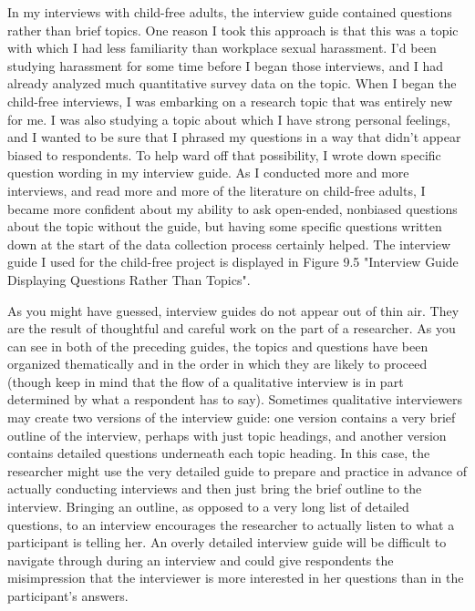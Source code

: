 In my interviews with child-free adults, the interview guide contained questions rather than brief topics. One reason I took this approach is that this was a topic with which I had less familiarity than workplace sexual harassment. I’d been studying harassment for some time before I began those interviews, and I had already analyzed much quantitative survey data on the topic. When I began the child-free interviews, I was embarking on a research topic that was entirely new for me. I was also studying a topic about which I have strong personal feelings, and I wanted to be sure that I phrased my questions in a way that didn’t appear biased to respondents. To help ward off that possibility, I wrote down specific question wording in my interview guide. As I conducted more and more interviews, and read more and more of the literature on child-free adults, I became more confident about my ability to ask open-ended, nonbiased questions about the topic without the guide, but having some specific questions written down at the start of the data collection process certainly helped. The interview guide I used for the child-free project is displayed in Figure 9.5 "Interview Guide Displaying Questions Rather Than Topics".

As you might have guessed, interview guides do not appear out of thin air. They are the result of thoughtful and careful work on the part of a researcher. As you can see in both of the preceding guides, the topics and questions have been organized thematically and in the order in which they are likely to proceed (though keep in mind that the flow of a qualitative interview is in part determined by what a respondent has to say). Sometimes qualitative interviewers may create two versions of the interview guide: one version contains a very brief outline of the interview, perhaps with just topic headings, and another version contains detailed questions underneath each topic heading. In this case, the researcher might use the very detailed guide to prepare and practice in advance of actually conducting interviews and then just bring the brief outline to the interview. Bringing an outline, as opposed to a very long list of detailed questions, to an interview encourages the researcher to actually listen to what a participant is telling her. An overly detailed interview guide will be difficult to navigate through during an interview and could give respondents the misimpression that the interviewer is more interested in her questions than in the participant’s answers.

